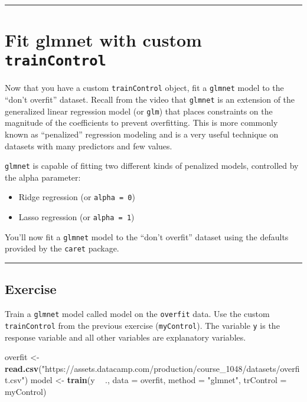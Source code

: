 \documentclass[
]{book}
\newenvironment{Shaded}{\begin{snugshade}}{\end{snugshade}}
\newcommand{\DataTypeTok}[1]{\textcolor[rgb]{0.13,0.29,0.53}{#1}}
\newcommand{\KeywordTok}[1]{\textcolor[rgb]{0.13,0.29,0.53}{\textbf{#1}}}
\newcommand{\NormalTok}[1]{#1}
\newcommand{\OperatorTok}[1]{\textcolor[rgb]{0.81,0.36,0.00}{\textbf{#1}}}
\newcommand{\StringTok}[1]{\textcolor[rgb]{0.31,0.60,0.02}{#1}}
\begin{document}
\begin{center}\rule{0.5\linewidth}{0.5pt}\end{center}

\hypertarget{fit-glmnet-with-custom-traincontrol}{%
\section{\texorpdfstring{Fit glmnet with custom \texttt{trainControl}}{Fit glmnet with custom trainControl}}\label{fit-glmnet-with-custom-traincontrol}}

Now that you have a custom \texttt{trainControl} object, fit a \texttt{glmnet} model to the ``don't overfit'' dataset. Recall from the video that \texttt{glmnet} is an extension of the generalized linear regression model (or \texttt{glm}) that places constraints on the magnitude of the coefficients to prevent overfitting. This is more commonly known as ``penalized'' regression modeling and is a very useful technique on datasets with many predictors and few values.

\texttt{glmnet} is capable of fitting two different kinds of penalized models, controlled by the alpha parameter:

\begin{itemize}
\item
  Ridge regression (or \texttt{alpha\ =\ 0})
\item
  Lasso regression (or \texttt{alpha\ =\ 1})
\end{itemize}

You'll now fit a \texttt{glmnet} model to the ``don't overfit'' dataset using the defaults provided by the \texttt{caret} package.

\begin{center}\rule{0.5\linewidth}{0.5pt}\end{center}

\hypertarget{exercise-21}{%
\subsection*{Exercise}\label{exercise-21}}

Train a \texttt{glmnet} model called model on the \texttt{overfit} data. Use the custom \texttt{trainControl} from the previous exercise (\texttt{myControl}). The variable \texttt{y} is the response variable and all other variables are explanatory variables.

\begin{Shaded}
\begin{Highlighting}[]
\NormalTok{overfit <-}\StringTok{ }\KeywordTok{read.csv}\NormalTok{(}\StringTok{"https://assets.datacamp.com/production/course_1048/datasets/overfit.csv"}\NormalTok{)}
\NormalTok{model <-}\StringTok{ }\KeywordTok{train}\NormalTok{(y }\OperatorTok{~}\StringTok{ }\NormalTok{., }
               \DataTypeTok{data =}\NormalTok{ overfit, }
               \DataTypeTok{method =} \StringTok{"glmnet"}\NormalTok{,}
               \DataTypeTok{trControl =}\NormalTok{ myControl)}
\end{Highlighting}
\end{Shaded}
\end{document}
